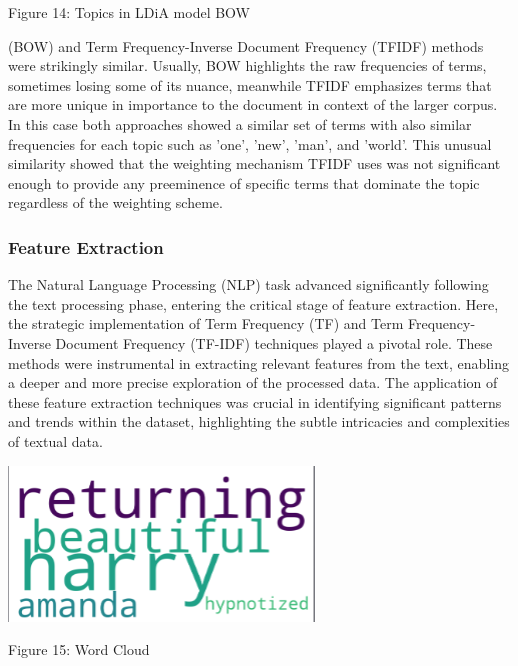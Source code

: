 \documentclass{article}
\begin{document}
\begin{multicols}{2}
{\small
  Figure 14: Topics in LDiA model BOW
  \par
  \vspace{6pt}
}

(BOW) and Term Frequency-Inverse Document Frequency (TFIDF) methods were strikingly similar. Usually, BOW highlights the raw frequencies of terms, sometimes losing some of its nuance, meanwhile TFIDF emphasizes terms that are more unique in importance to the document in context of the larger corpus. In this case both approaches showed a similar set of terms with also similar frequencies for each topic such as 'one', 'new', 'man', and 'world'. This unusual similarity showed that the weighting mechanism TFIDF uses was not significant enough to provide any preeminence of specific terms that dominate the topic regardless of the weighting scheme.

\subsubsection{Feature Extraction}

The Natural Language Processing (NLP) task advanced significantly following the text processing phase, entering the critical stage of feature extraction. Here, the strategic implementation of Term Frequency (TF) and Term Frequency-Inverse Document Frequency (TF-IDF) techniques played a pivotal role. These methods were instrumental in extracting relevant features from the text, enabling a deeper and more precise exploration of the processed data. The application of these feature extraction techniques was crucial in identifying significant patterns and trends within the dataset, highlighting the subtle intricacies and complexities of textual data.
\par
\vspace{6pt}

\includegraphics[scale=.7]{img/nlp3.png}

{\small
  Figure 15: Word Cloud
  \par
  \vspace{6pt}
}


\end{multicols}
\end{document}

